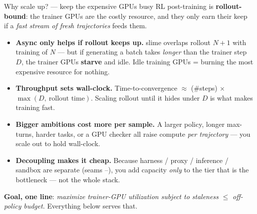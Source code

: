 \documentclass[aspectratio=169]{beamer}
\begin{document}
\begin{frame}{Why scale up? --- keep the expensive GPUs busy}
  \footnotesize RL post-training is \textbf{rollout-bound}: the trainer GPUs are the costly resource,
  and they only earn their keep if a \emph{fast stream of fresh trajectories} feeds them.
  \vspace{0.3em}
  \begin{itemize}\setlength\itemsep{0.4em}
    \item \textbf{Async only helps if rollout keeps up.} slime overlaps rollout $N{+}1$ with training
      of $N$ --- but if generating a batch takes \emph{longer} than the trainer step $D$, the trainer
      GPUs \textbf{starve} and idle. Idle training GPUs = burning the most expensive resource for nothing.
    \item \textbf{Throughput sets wall-clock.} Time-to-convergence $\approx$ (\#steps) $\times$
      $\max(D,\ \text{rollout time})$. Scaling rollout until it hides under $D$ is what makes training fast.
    \item \textbf{Bigger ambitions cost more per sample.} A larger policy, longer max-turns, harder
      tasks, or a GPU checker all raise compute \emph{per trajectory} --- you scale out to hold wall-clock.
    \item \textbf{Decoupling makes it cheap.} Because harness / proxy / inference / sandbox are separate
      (seams --), you add capacity \emph{only} to the tier that is the bottleneck ---
      not the whole stack.
  \end{itemize}
  \vspace{0.2em}
  {\scriptsize \textbf{Goal, one line}: \emph{maximize trainer-GPU utilization subject to staleness
  $\le$ off-policy budget.} Everything below serves that.}
\end{frame}
\end{document}
